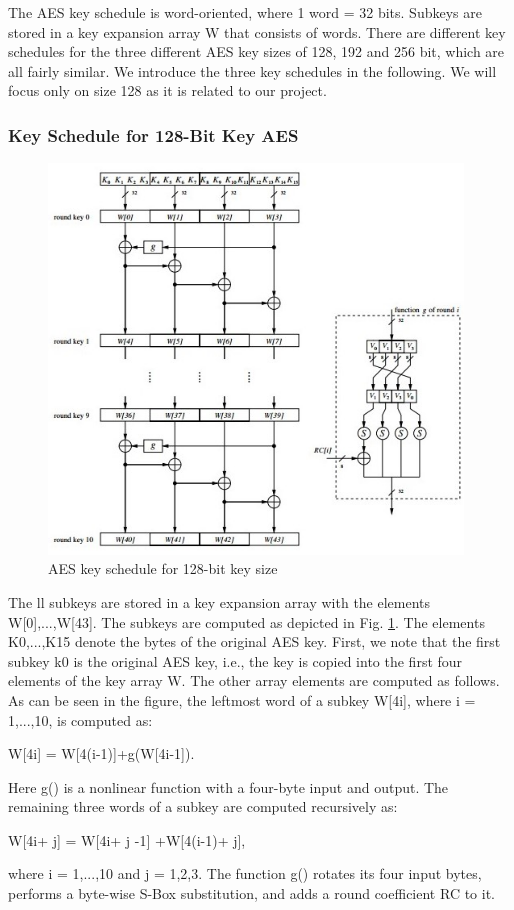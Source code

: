 \documentclass[../main.tex]{subfiles}
\begin{document}
The AES key schedule is word-oriented, where 1 word = 32 bits. Subkeys are
stored in a key expansion array W that consists of words. There are different key
schedules for the three different AES key sizes of 128, 192 and 256 bit, which are
all fairly similar. We introduce the three key schedules in the following.
We will focus only on size 128 as it is related to our project.\cite{10.5555/1721909}
\subsubsection{Key Schedule for 128-Bit Key AES}
\begin{figure}[h]
\centering
\includegraphics[width=11cm]{diagrams/cryp14.jpg}

\caption{AES key schedule for 128-bit key size}
\label{fig:cryp14}
\end{figure}
The ll subkeys are stored in a key expansion array with the elements W[0],...,W[43].
The subkeys are computed as depicted in Fig. \ref{fig:cryp14}. The elements K0,...,K15 denote
the bytes of the original AES key.
First, we note that the first subkey k0 is the original AES key, i.e., the key is
copied into the first four elements of the key array W. The other array elements are computed as follows. As can be seen in the figure, the leftmost word of a subkey
W[4i], where i = 1,...,10, is computed as:
\begin{center} 
W[4i] = W[4(i-1)]+g(W[4i-1]).
\end{center}
Here g() is a nonlinear function with a four-byte input and output. The remaining
three words of a subkey are computed recursively as:
\begin{center} 
W[4i+ j] = W[4i+ j -1] +W[4(i-1)+ j],
\end{center}
where i = 1,...,10 and j = 1,2,3. The function g() rotates its four input bytes,
performs a byte-wise S-Box substitution, and adds a round coefficient RC to it.
\end{document}
